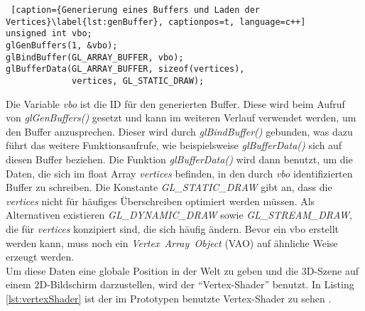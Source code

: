 \documentclass[11pt,a4paper]{article}
\begin{document}
\begin{lstlisting} [caption={Generierung eines Buffers und Laden der Vertices}\label{lst:genBuffer}, captionpos=t, language=c++]
unsigned int vbo;
glGenBuffers(1, &vbo);
glBindBuffer(GL_ARRAY_BUFFER, vbo);
glBufferData(GL_ARRAY_BUFFER, sizeof(vertices),
             vertices, GL_STATIC_DRAW);
\end{lstlisting}
\noindent
Die Variable \textit{vbo} ist die ID für den generierten Buffer. Diese wird beim Aufruf von \mbox{\textit{glGenBuffers()}} gesetzt und kann im weiteren Verlauf verwendet werden, um den Buffer anzusprechen. Dieser wird durch \mbox{\textit{glBindBuffer()}} gebunden, was dazu führt das weitere Funktionsaufrufe, wie beispielsweise \mbox{\textit{glBufferData()}} sich auf diesen Buffer beziehen. Die Funktion \mbox{\textit{glBufferData()}} wird dann benutzt, um die Daten, die sich im float Array \mbox{\textit{vertices}} befinden, in den durch \mbox{\textit{vbo}} identifizierten Buffer zu schreiben. Die Konstante \mbox{\textit{GL\_STATIC\_DRAW}} gibt an, dass die \mbox{\textit{vertices}} nicht für häufiges Überschreiben optimiert werden müssen. Als Alternativen existieren \mbox{\textit{GL\_DYNAMIC\_DRAW}} sowie \mbox{\textit{GL\_STREAM\_DRAW}}, die für \mbox{\textit{vertices}} konzipiert sind, die sich häufig ändern. Bevor ein vbo erstellt werden kann, muss noch ein \mbox{\textit{Vertex Array Object}} (VAO) auf ähnliche Weise erzeugt werden.\\
Um diese Daten eine globale Position in der Welt zu geben und die 3D-Szene auf einem 2D-Bildschirm darzustellen, wird der ``Vertex-Shader'' benutzt. In Listing \ref{lst:vertexShader} ist der im Prototypen benutzte Vertex-Shader zu sehen \cite[Coordinate Systems]{LearnOpenGL}.
\end{document}
